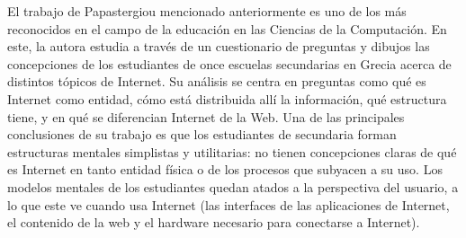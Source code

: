 \begin{table}[H]
\centering
{}
\end{table}

El trabajo de Papastergiou \cite{papastergiou} mencionado anteriormente es uno de los más reconocidos en el campo de la educación en las Ciencias de la Computación. En este, la autora estudia a través de un cuestionario de preguntas y dibujos las concepciones de los estudiantes de once escuelas secundarias en Grecia acerca de distintos tópicos de Internet. Su análisis se centra en preguntas como qué es Internet como entidad, cómo está distribuida allí la información, qué estructura tiene, y  en qué se diferencian Internet de la Web. Una de las principales conclusiones de su trabajo es que los estudiantes de secundaria forman estructuras mentales simplistas y utilitarias: no tienen concepciones claras de qué es Internet en tanto entidad física o de los procesos que subyacen a su uso. Los modelos mentales de los estudiantes quedan atados a la perspectiva del usuario, a lo que este ve cuando usa Internet (las interfaces de las aplicaciones de Internet, el contenido de la web y el hardware necesario para conectarse a Internet).

